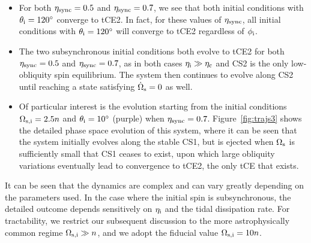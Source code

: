 \documentclass[
        fleqn,
        usenatbib,
    ]{mnras}
\begin{document}
\begin{itemize}
    \item For both $\eta_{\rm sync} = 0.5$ and $\eta_{\rm sync} = 0.7$, we see
        that both initial conditions with $\theta_{\rm i} = 120^\circ$ converge
        to tCE2. In fact, for these values of $\eta_{\rm sync}$, all initial
        conditions with $\theta_{\rm i} = 120^\circ$ will converge to tCE2
        regardless of $\phi_{\rm i}$.

    \item The two subsynchronous initial conditions both evolve to tCE2 for both
        $\eta_{\rm sync} = 0.5$ and $\eta_{\rm sync} = 0.7$, as in both cases
        $\eta_{\rm i} \gg \eta_{\rm c}$ and CS2 is the only low-obliquity spin
        equilibrium. The system then continues to evolve along CS2 until
        reaching a state satisfying $\dot{\Omega}_{\rm s} = 0$ as well.

    \item Of particular interest is the evolution starting from the initial
        conditions $\Omega_{\rm s, i} = 2.5n$ and $\theta_{\rm i} = 10^\circ$
        (purple) when $\eta_{\rm sync} = 0.7$. Figure~\ref{fig:trajs3} shows the
        detailed phase space evolution of this system, where it can be seen that
        the system initially evolves along the stable CS1, but is ejected when
        $\Omega_{\rm s}$ is sufficiently small that CS1 ceases to exist, upon
        which large obliquity variations eventually lead to convergence to tCE2,
        the only tCE that exists.
\end{itemize}
It can be seen that the dynamics are complex and can vary greatly depending on
the parameters used. In the case where the initial spin is subsynchronous, the
detailed outcome depends sensitively on $\eta_{\rm i}$ and the tidal dissipation
rate. For tractability, we restrict our subsequent discussion to the more
astrophysically common regime $\Omega_{\rm s, i} \gg n$, and we adopt the
fiducial value $\Omega_{\rm s, i} = 10n$.
\end{document}
